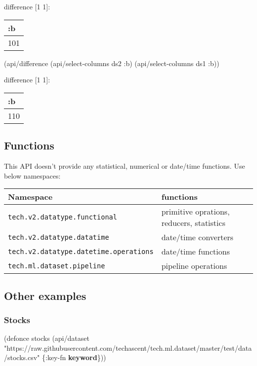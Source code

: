 \documentclass[]{article}
\newenvironment{Shaded}{\begin{snugshade}}{\end{snugshade}}
\newcommand{\KeywordTok}[1]{\textcolor[rgb]{0.13,0.29,0.53}{\textbf{#1}}}
\newcommand{\StringTok}[1]{\textcolor[rgb]{0.31,0.60,0.02}{#1}}
\newcommand{\FunctionTok}[1]{\textcolor[rgb]{0.00,0.00,0.00}{#1}}
\newcommand{\BuiltInTok}[1]{#1}
\newcommand{\AttributeTok}[1]{\textcolor[rgb]{0.77,0.63,0.00}{#1}}
\newcommand{\NormalTok}[1]{#1}
\begin{document}
difference {[}1 1{]}:

\begin{longtable}[]{@{}l@{}}
\toprule
:b\tabularnewline
\midrule
\endhead
101\tabularnewline
\bottomrule
\end{longtable}

\begin{Shaded}
\begin{Highlighting}[]
\NormalTok{(api/difference (api/select-columns ds2 }\AttributeTok{:b}\NormalTok{)}
\NormalTok{                (api/select-columns ds1 }\AttributeTok{:b}\NormalTok{))}
\end{Highlighting}
\end{Shaded}

difference {[}1 1{]}:

\begin{longtable}[]{@{}l@{}}
\toprule
:b\tabularnewline
\midrule
\endhead
110\tabularnewline
\bottomrule
\end{longtable}

\subsection{Functions}\label{functions}

This API doesn't provide any statistical, numerical or date/time
functions. Use below namespaces:

\begin{longtable}[]{@{}ll@{}}
\toprule
Namespace & functions\tabularnewline
\midrule
\endhead
\texttt{tech.v2.datatype.functional} & primitive oprations, reducers,
statistics\tabularnewline
\texttt{tech.v2.datatype.datatime} & date/time converters\tabularnewline
\texttt{tech.v2.datatype.datetime.operations} & date/time
functions\tabularnewline
\texttt{tech.ml.dataset.pipeline} & pipeline operations\tabularnewline
\bottomrule
\end{longtable}

\subsection{Other examples}\label{other-examples}

\subsubsection{Stocks}\label{stocks}

\begin{Shaded}
\begin{Highlighting}[]
\NormalTok{(}\BuiltInTok{defonce}\FunctionTok{ stocks }\NormalTok{(api/dataset }\StringTok{"https://raw.githubusercontent.com/techascent/tech.ml.dataset/master/test/data/stocks.csv"}\NormalTok{ \{}\AttributeTok{:key-fn} \KeywordTok{keyword}\NormalTok{\}))}
\end{Highlighting}
\end{Shaded}
\end{document}
